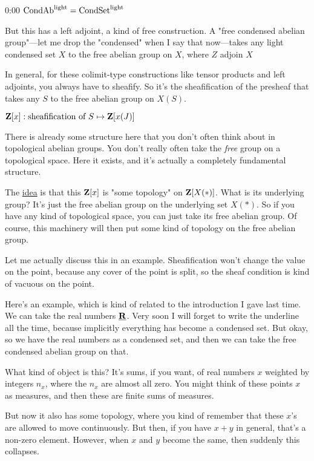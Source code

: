 \begin{unfinished}{0:00}
$\mathrm{Cond}\mathrm{Ab}^{\mathrm{light}} = \mathrm{Cond}\mathrm{Set}^{\mathrm{light}}$

But this has a left adjoint, a kind of free construction. A "free condensed abelian group"---let me drop the "condensed" when I say that now---takes any light condensed set $X$ to the free abelian group on $X$, where $Z$ adjoin $X$

In general, for these colimit-type constructions like tensor products and left adjoints, you always have to sheafify. So it's the sheafification of the presheaf that takes any $S$ to the free abelian group on $X(S)$.

$ \mathbf Z[x]: \text{sheafification of } S \mapsto \mathbf Z[x(J)]$

There is already some structure here that you don't often think about in topological abelian groups. You don't really often take the \emph{free} group on a topological space. Here it exists, and it's actually a completely fundamental structure.

The \underline{idea} is that this $\mathbf Z[x]$ is "some topology" on $\mathbf Z[X(\ast)]$. What is its underlying group? It's just the free abelian group on the underlying set $X(\ast)$. So if you have any kind of topological space, you can just take its free abelian group. Of course, this machinery will then put some kind of topology on the free abelian group.

Let me actually discuss this in an example. Sheafification won't change the value on the point, because any cover of the point is split, so the sheaf condition is kind of vacuous on the point.

Here's an example, which is kind of related to the introduction I gave last time. We can take the real numbers $\underline{\mathbf R}$. Very soon I will forget to write the underline all the time, because implicitly everything has become a condensed set. But okay, so we have the real numbers as a condensed set, and then we can take the free condensed abelian group on that.

What kind of object is this? It's sums, if you want, of real numbers $x$ weighted by integers $n_x$, where the $n_x$ are almost all zero. You might think of these points $x$ as measures, and then these are finite sums of measures.

But now it also has some topology, where you kind of remember that these $x$'s are allowed to move continuously. But then, if you have $x + y$ in general, that's a non-zero element. However, when $x$ and $y$ become the same, then suddenly this collapses.


\end{unfinished}
